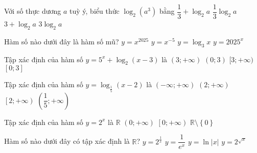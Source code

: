\begin{ex}%
	Với số thực dương $a$ tuỳ ý, biểu thức $\log_2(a^3)$ bằng
	\choice
	{$\dfrac{1}{3}+\log_2a$}
	{$\dfrac{1}{3}\log_2a$}
	{$3+\log_2a$}
	{\True $3\log_2a$}
\end{ex}

\begin{ex}%
	Hàm số nào dưới đây là hàm số mũ?
	\choice
	{$y=x^{2025}$}
	{$y=x^{-5}$}
	{$y=\log _3 x$}
	{\True $y=2025^x$}
\end{ex}


\begin{ex}%
	Tập xác định của hàm số $y=5^x+\log_2(x-3)$ là
	\choice
	{\True $(3;+\infty)$}
	{$(0;3)$}
	{$[3;+\infty)$}
	{$[0;3]$}
\end{ex}

%

\begin{ex}%
	Tập xác định của hàm số $y = \log_{\frac{1}{5}}(x-2)$ là
	\choice
	{$(-\infty;+\infty)$}
	{\True $(2;+\infty)$}
	{$\left[2;+\infty\right)$}
	{$\left(\dfrac{1}{5};+\infty\right)$}
\end{ex}

\begin{ex}%
	Tập xác định của hàm số $y=2^x$ là
	\choice
	{\True $\mathbb{R}$}
	{$\left(0;+\infty\right)$}
	{$\left[0;+\infty\right)$}
	{$\mathbb{R}\setminus\left\{0\right\}$}
\end{ex}

%

\begin{ex}%
	Hàm số nào dưới đây có tập xác định là $\mathbb{R}$?
	\choice
	{$y=2^{\tfrac{1}{x}}$}
	{\True $y=\dfrac{1}{e^x}$}
	{$y=\ln |x|$}
	{$y=2^{\sqrt{x}}$}
	\loigiai{
	}
\end{ex}

